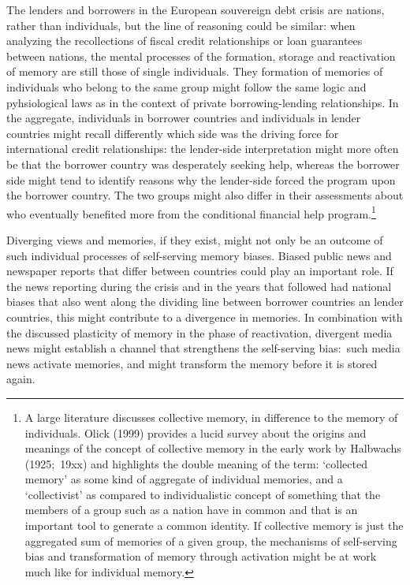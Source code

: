 The lenders and borrowers in the European souvereign debt crisis are
nations, rather than individuals, but the line of reasoning could be
similar: when analyzing the recollections of fiscal credit relationships or
loan guarantees between nations, the mental processes of the formation,
storage and reactivation of memory are still those of single individuals.
They formation of memories of individuals who belong to the same group might
follow the same logic and pyhsiological laws as in the context of private
borrowing-lending relationships. In the aggregate, individuals in borrower
countries and individuals in lender countries might recall differently which
side was the driving force for international credit relationships: the
lender-side interpretation might more often be that the borrower country was
desperately seeking help, whereas the borrower side might tend to identify
reasons why the lender-side forced the program upon the borrower country.
The two groups might also differ in their assessments about who eventually
benefited more from the conditional financial help program.\footnote{%
A large literature discusses collective memory, in difference to the memory
of individuals. Olick (1999) provides a lucid survey about the origins and
meanings of the concept of collective memory in the early work by Halbwachs
(1925;\ 19xx) and highlights the double meaning of the term: `collected
memory' as some kind of aggregate of individual memories, and a
`collectivist' as compared to individualistic concept of something that the
members of a group such as a nation have in common and that is an important
tool to generate a common identity. If collective memory is just the
aggregated sum of memories of a given group, the mechanisms of self-serving
bias and transformation of memory through activation might be at work much
like for individual memory.}

Diverging views and memories, if they exist, might not only be an outcome of
such individual processes of self-serving memory biases. Biased public news
and newspaper reports that differ between countries could play an important
role. If the news reporting during the crisis and in the years that followed
had national biases that also went along the dividing line between borrower
countries an lender countries, this might contribute to a divergence in
memories. In combination with the discussed plasticity of memory in the
phase of reactivation, divergent media news might establish a channel that
strengthens the self-serving bias:\ such media news activate memories, and
might transform the memory before it is stored again.

